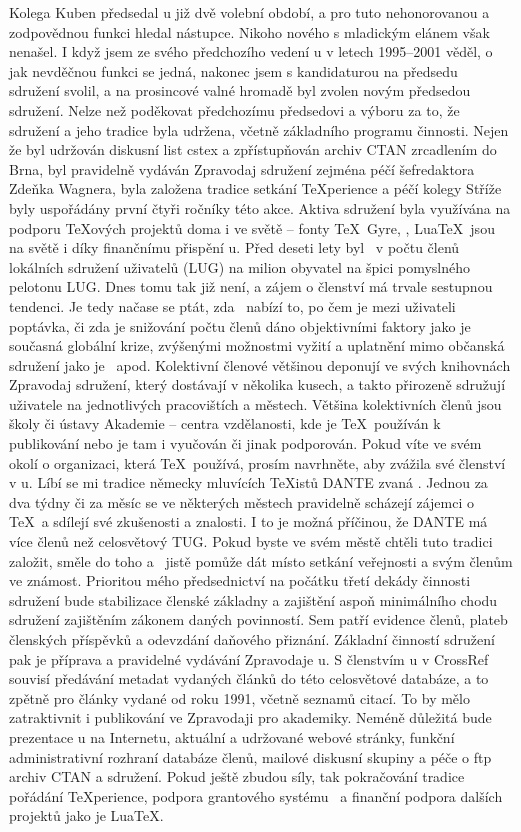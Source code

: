 Kolega Kuben předsedal \CSTUG u již dvě volební období, a pro tuto nehonorovanou a zodpovědnou funkci hledal nástupce. Nikoho nového s mladickým elánem však nenašel. I když jsem ze svého předchozího vedení \CSTUG u v letech 1995--2001 věděl, o jak nevděčnou funkci se jedná, nakonec jsem s kandidaturou na předsedu sdružení svolil, a na prosincové valné hromadě byl zvolen novým předsedou sdružení.
Nelze než poděkovat předchozímu předsedovi a výboru za to, že sdružení a jeho tradice byla udržena, včetně základního programu činnosti. Nejen že byl udržován diskusní list cstex a zpřístupňován archiv CTAN zrcadlením do Brna, byl pravidelně vydáván Zpravodaj sdružení zejména péčí šefredaktora Zdeňka Wagnera, byla založena tradice setkání \TeX perience a péčí kolegy Stříže byly uspořádány první čtyři ročníky této akce.  Aktiva sdružení byla využívána na podporu \TeX ových projektů doma i ve světě -- fonty \TeX\ Gyre, \MP, Lua\TeX\ jsou na světě i díky finančnímu přispění \CSTUG u.
Před deseti lety byl \CSTUG\ v počtu členů lokálních sdružení uživatelů (LUG) na milion obyvatel na špici pomyslného pelotonu LUG. Dnes tomu tak již není, a zájem o členství má trvale sestupnou tendenci. Je tedy načase se ptát, zda \CSTUG\ nabízí to, po čem je mezi uživateli poptávka, či zda je snižování počtu členů dáno objektivními faktory jako je současná globální krize, zvýšenými možnostmi vyžití a uplatnění mimo občanská sdružení jako je \CSTUG\ apod.
Kolektivní členové většinou deponují ve svých knihovnách Zpravodaj sdružení, který dostávají v několika kusech, a takto přirozeně sdružují uživatele na jednotlivých pracovištích a městech. Většina kolektivních členů jsou školy či ústavy Akademie -- centra vzdělanosti, kde je \TeX\ používán k publikování nebo je tam i vyučován či jinak podporován.  Pokud víte ve svém okolí o organizaci, která \TeX\ používá, prosím navrhněte, aby zvážila své členství v \CSTUG u.
Líbí se mi tradice německy mluvících \TeX istů DANTE zvaná .  Jednou za dva týdny či za měsíc se ve některých městech pravidelně scházejí zájemci o \TeX\ a sdílejí své zkušenosti a znalosti.  I to je možná příčinou, že DANTE má více členů než celosvětový TUG.  Pokud byste ve svém městě chtěli tuto tradici založit, směle do toho a \CSTUG\ jistě pomůže dát místo setkání veřejnosti a svým členům ve známost.
Prioritou mého předsednictví na počátku třetí dekády činnosti sdružení bude stabilizace členské základny a zajištění aspoň minimálního chodu sdružení zajištěním zákonem daných povinností. Sem patří evidence členů, plateb členských příspěvků a odevzdání daňového přiznání. Základní činností sdružení pak je příprava a pravidelné vydávání Zpravodaje \CSTUG u. S členstvím \CSTUG u v CrossRef souvisí předávání metadat vydaných článků do této celosvětové databáze, a to zpětně pro články vydané od roku 1991, včetně seznamů citací. To by mělo zatraktivnit i publikování ve Zpravodaji pro akademiky.  Neméně důležitá bude prezentace \CSTUG u na Internetu, aktuální a udržované webové stránky, funkční administrativní rozhraní databáze členů, mailové diskusní skupiny a péče o ftp archiv CTAN a sdružení. Pokud ještě zbudou síly, tak pokračování tradice pořádání \TeX perience, podpora grantového systému \CSTUG\ a finanční podpora dalších projektů jako je Lua\TeX.
